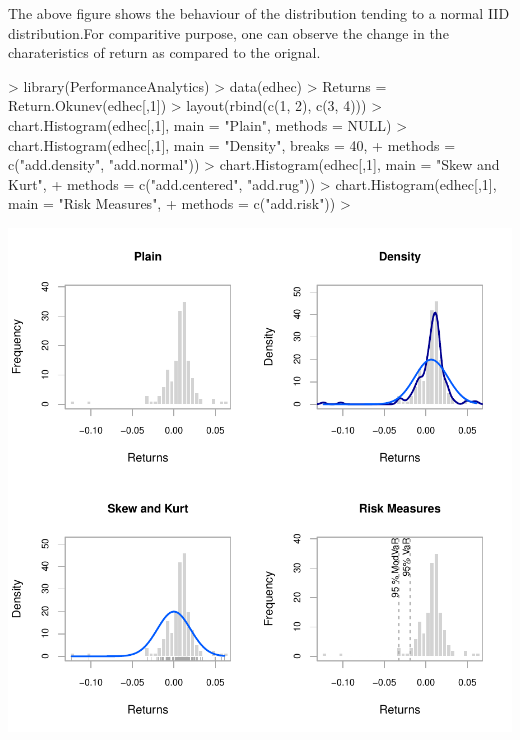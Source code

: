\documentclass[12pt,letterpaper,english]{article}
\begin{document}
The above figure shows the behaviour of the distribution tending to a normal IID distribution.For comparitive purpose, one can observe the change in the charateristics of return as compared to the orignal.
\begin{Schunk}
\begin{Sinput}
> library(PerformanceAnalytics)
> data(edhec)
> Returns = Return.Okunev(edhec[,1])
> layout(rbind(c(1, 2), c(3, 4)))
>  chart.Histogram(edhec[,1], main = "Plain", methods = NULL)
>  chart.Histogram(edhec[,1], main = "Density", breaks = 40,
+  methods = c("add.density", "add.normal"))
>  chart.Histogram(edhec[,1], main = "Skew and Kurt",
+  methods = c("add.centered", "add.rug"))
> chart.Histogram(edhec[,1], main = "Risk Measures",
+  methods = c("add.risk"))
> 
\end{Sinput}
\end{Schunk}
\includegraphics{OkunevWhite-004}
\end{document}
